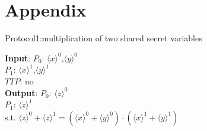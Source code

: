 \documentclass[11pt,twoside,a4paper]{article}
\begin{document}
\section{Appendix}

\begin{algorithm}[htbp]
	\caption{Protocol1:multiplication of two shared secret variables}
	\textbf{Input}: $P_{0}$: $\langle x\rangle ^{0}$,$\langle y\rangle ^{0}$\\
	$P_{1}$: $\langle x\rangle ^{1}$,$\langle y\rangle ^{1}$\\
	$TTP$: no\\

	\textbf{Output}: $P_{0}$: $\langle z\rangle ^{0}$\\
	$P_{1}$: $\langle z\rangle ^{1}$\\
	s.t. $\langle z\rangle ^{0}+\langle z\rangle ^{1}=(\langle x\rangle ^{0}+\langle y\rangle ^{0})\cdot(\langle x\rangle ^{1}+\langle y\rangle ^{1}) $\\
\end{algorithm}
\end{document}

